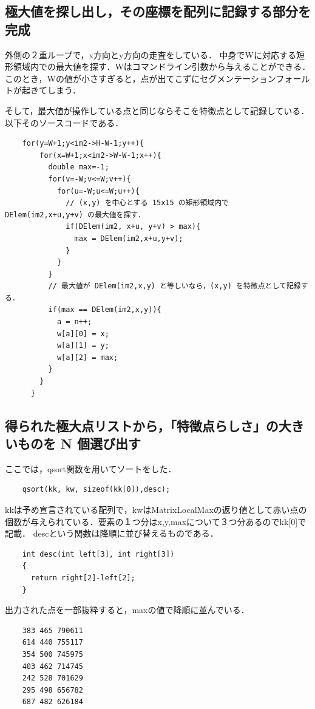 \documentclass[11pt]{jarticle}
\begin{document}
\subsection{極大値を探し出し，その座標を配列に記録する部分を完成}

外側の２重ループで，x方向とy方向の走査をしている．
中身でWに対応する短形領域内での最大値を探す．Wはコマンドライン引数から与えることができる．
このとき，Wの値が小さすぎると，点が出てこずにセグメンテーションフォールトが起きてしまう．

そして，最大値が操作している点と同じならそこを特徴点として記録している．以下そのソースコードである．

\begin{verbatim}
    for(y=W+1;y<im2->H-W-1;y++){
        for(x=W+1;x<im2->W-W-1;x++){
          double max=-1;
          for(v=-W;v<=W;v++){
            for(u=-W;u<=W;u++){
              // (x,y) を中心とする 15x15 の矩形領域内で DElem(im2,x+u,y+v) の最大値を探す．
              if(DElem(im2, x+u, y+v) > max){
                max = DElem(im2,x+u,y+v);
              } 
            }
          }
          // 最大値が DElem(im2,x,y) と等しいなら，(x,y) を特徴点として記録する． 
          if(max == DElem(im2,x,y)){
            a = n++; 
            w[a][0] = x;
            w[a][1] = y;
            w[a][2] = max;
          }
        }
      }
\end{verbatim}

\subsection{得られた極大点リストから，「特徴点らしさ」の大きいものを N 個選び出す}

ここでは，qsort関数を用いてソートをした．

\begin{verbatim}
    qsort(kk, kw, sizeof(kk[0]),desc);
\end{verbatim}

kkは予め宣言されている配列で，kwはMatrixLocalMaxの返り値として赤い点の個数が与えられている．要素の１つ分はx,y,maxについて３つ分あるのでkk[0]で記載．
descという関数は降順に並び替えるものである．
\begin{verbatim}
    int desc(int left[3], int right[3])
    {
      return right[2]-left[2];
    }
\end{verbatim}

出力された点を一部抜粋すると，maxの値で降順に並んでいる．
\begin{verbatim}
    383 465 790611
    614 440 755117
    354 500 745975
    403 462 714745
    242 528 701629
    295 498 656782
    687 482 626184
\end{verbatim}
\end{document}
